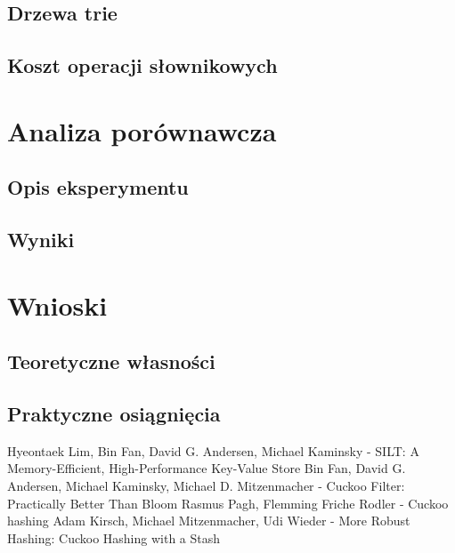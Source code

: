 \documentclass[declaration,shortabstract,masc]{iithesis}
\begin{document}
		\section{Drzewa trie}
		\section{Koszt operacji słownikowych}
	\chapter{Analiza porównawcza}
		\section{Opis eksperymentu}
		\section{Wyniki}
	\chapter{Wnioski}
		\section{Teoretyczne własności}
		\section{Praktyczne osiągnięcia}
	\begin{thebibliography}{3}
		 Hyeontaek Lim, Bin Fan, David G. Andersen, Michael Kaminsky - SILT: A Memory-Efficient, High-Performance Key-Value Store
		 Bin Fan, David G. Andersen, Michael Kaminsky, Michael D. Mitzenmacher - Cuckoo Filter: Practically Better Than Bloom
		 Rasmus Pagh, Flemming Friche Rodler - Cuckoo hashing
		 Adam Kirsch, Michael Mitzenmacher, Udi Wieder - More Robust Hashing: Cuckoo Hashing with a Stash
	\end{thebibliography}
\end{document}
